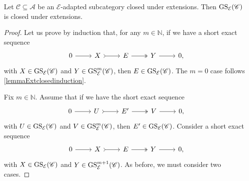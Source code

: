 \begin{prop}
\label{prop:Extclosed}
Let $\mathscr{C} \subseteq \mathscr{A}$ be an $\mathcal{E}$-adapted subcategory closed under extensions. Then $\operatorname{GS}_{\mathcal{E}}(\mathscr{C})$ is closed under extensions.
\end{prop}

\begin{proof}
 Let us prove by induction that, for any $m \in \mathbb{N}$, if we have a short exact sequence
\[\begin{tikzcd}
	0 & X & E  & Y &  0,
	\arrow[from=1-1, to=1-2]
	\arrow[tail, from=1-2, to=1-3]
	\arrow[two heads,from=1-3, to=1-4]
	\arrow[from=1-4, to=1-5]
\end{tikzcd} \] with  $X\in \operatorname{GS}_{\mathcal{E}}(\mathscr{C})$ and $Y\in \operatorname{GS}^m_{\mathcal{E}} (\mathscr{C})$, then $E \in  \operatorname{GS}_{\mathcal{E}}(\mathscr{C})$. The $m=0$ case follows \cref{lemmaExtclosedinduction}.

Fix $m \in \mathbb{N}$. Assume that if we have the short exact sequence 
\[\begin{tikzcd}
	0 & U & E' & V &  0,
	\arrow[from=1-1, to=1-2]
	\arrow[tail, from=1-2, to=1-3]
	\arrow[two heads,from=1-3, to=1-4]
	\arrow[from=1-4, to=1-5]
\end{tikzcd} \]
with $U \in \operatorname{GS}_{\mathcal{E}}(\mathscr{C})$ and $V \in \operatorname{GS}^{m}_{\mathcal{E}}(\mathscr{C})$, then $E' \in \operatorname{GS}_{\mathcal{E}}(\mathscr{C})$. Consider a short exact sequence \[\begin{tikzcd}
	0 & X & E  & Y &  0,
	\arrow[from=1-1, to=1-2]
	\arrow[tail, from=1-2, to=1-3]
	\arrow[two heads,from=1-3, to=1-4]
	\arrow[from=1-4, to=1-5]
\end{tikzcd} \] with $X \in \operatorname{GS}_\mathcal{E}(\mathscr{C})$ and $Y \in \operatorname{GS}_\mathcal{E}^{m+1}(\mathscr{C})$. As before, we must consider two cases.


\end{proof}
